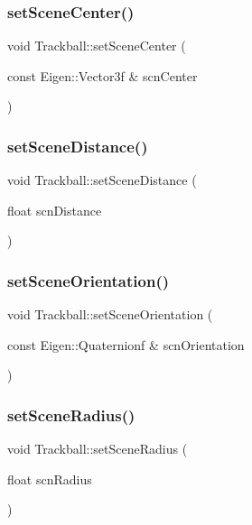 \subsubsection{\texorpdfstring{set\+Scene\+Center()}{setSceneCenter()}}
{\footnotesize\ttfamily void Trackball\+::set\+Scene\+Center (\begin{DoxyParamCaption}\item[{const Eigen\+::\+Vector3f \&}]{scn\+Center }\end{DoxyParamCaption})}

\mbox{\label{class_trackball_a20407b903581f2e34ca12592f8e0c41a}} 
\subsubsection{\texorpdfstring{set\+Scene\+Distance()}{setSceneDistance()}}
{\footnotesize\ttfamily void Trackball\+::set\+Scene\+Distance (\begin{DoxyParamCaption}\item[{float}]{scn\+Distance }\end{DoxyParamCaption})}

\mbox{\label{class_trackball_a0260225e8b58034f6bbc030a35c400e1}} 
\subsubsection{\texorpdfstring{set\+Scene\+Orientation()}{setSceneOrientation()}}
{\footnotesize\ttfamily void Trackball\+::set\+Scene\+Orientation (\begin{DoxyParamCaption}\item[{const Eigen\+::\+Quaternionf \&}]{scn\+Orientation }\end{DoxyParamCaption})}

\mbox{\label{class_trackball_ab546e1363934d09d8ed292dbd8b34e51}} 
\subsubsection{\texorpdfstring{set\+Scene\+Radius()}{setSceneRadius()}}
{\footnotesize\ttfamily void Trackball\+::set\+Scene\+Radius (\begin{DoxyParamCaption}\item[{float}]{scn\+Radius }\end{DoxyParamCaption})}


